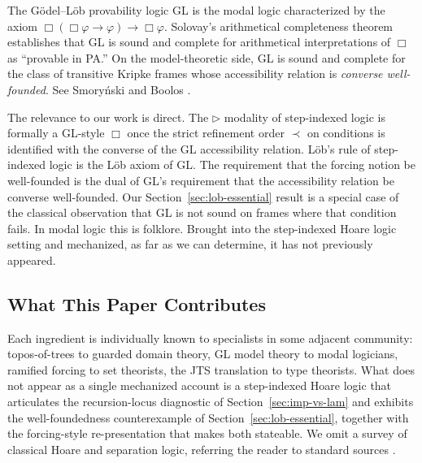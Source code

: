 The Gödel--Löb provability logic \textsf{GL} is the modal logic
characterized by the axiom $\Box(\Box \varphi \to \varphi) \to
\Box \varphi$.  Solovay's arithmetical completeness theorem
\cite{solovay1976} establishes that \textsf{GL} is sound and complete
for arithmetical interpretations of $\Box$ as ``provable in PA.''  On
the model-theoretic side, \textsf{GL} is sound and complete for the
class of transitive Kripke frames whose accessibility relation is
\emph{converse well-founded}. See Smoryński \citeyearpar{smorynski1985} and
Boolos \citeyearpar{boolos1993}.

The relevance to our work is direct.  The $\triangleright$ modality of
step-indexed logic is formally a \textsf{GL}-style $\Box$ once the
strict refinement order $\prec$ on conditions is identified with the
converse of the \textsf{GL} accessibility relation.  Löb's rule of
step-indexed logic is the Löb axiom of \textsf{GL}.  The requirement
that the forcing notion be well-founded is the dual of \textsf{GL}'s
requirement that the accessibility relation be converse well-founded.
Our Section~\ref{sec:lob-essential} result is a special case of the
classical observation that \textsf{GL} is not sound on frames where
that condition fails.  In modal logic this is folklore.  Brought into
the step-indexed Hoare logic setting and mechanized, as far as we can
determine, it has not previously appeared.

\subsection{What This Paper Contributes}

Each ingredient is individually known to specialists in some adjacent
community: topos-of-trees to guarded domain theory, \textsf{GL}
model theory to modal logicians, ramified forcing to set theorists,
the JTS translation to type theorists.  What does not appear as a
single mechanized account is a step-indexed Hoare logic that
articulates the recursion-locus diagnostic of
Section~\ref{sec:imp-vs-lam} and exhibits the well-foundedness
counterexample of Section~\ref{sec:lob-essential}, together with the
forcing-style re-presentation that makes both stateable.  We omit a
survey of classical Hoare and separation logic, referring the reader
to standard sources
\cite{hoare1969,ohearn-reynolds-yang-2001,brookes2007,cook1978}.
